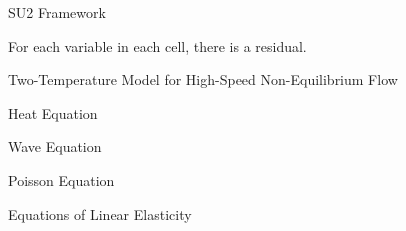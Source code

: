 \begin{frame}{SU2 Framework}

For each variable in each cell, there is a residual.
\end{frame}

\begin{frame}{Two-Temperature Model for High-Speed Non-Equilibrium Flow}
    
\end{frame}

\begin{frame}{Heat Equation}
    
\end{frame}

\begin{frame}{Wave Equation}
    
\end{frame}

\begin{frame}{Poisson Equation}
    
\end{frame}

\begin{frame}{Equations of Linear Elasticity}
    
\end{frame}